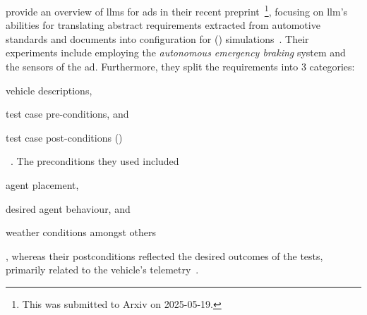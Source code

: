 \citeauthor{requirementsAllYouNeed} provide an overview of \acrshort{llms} for \acrshort{ads} in
their recent preprint~\footnote{This was submitted to Arxiv on
    2025-05-19.}, focusing on \acrshort{llm}'s abilities for translating abstract requirements extracted
from automotive standards and documents into configuration for \carla ()
simulations~\cite{requirementsAllYouNeed}. Their experiments include employing the
\textit{autonomous emergency braking} system and the sensors of the \acrshort{ad}. Furthermore, they
split the requirements into \num{3} categories: \begin{inparaenum}
    \item vehicle descriptions,
    \item test case pre-conditions, and
    \item test case post-conditions ()
\end{inparaenum}~\cite{requirementsAllYouNeed}. The preconditions they used included
\begin{inparaenum}
    \item agent placement,
    \item desired agent behaviour, and
    \item weather conditions amongst others\end{inparaenum}, whereas their postconditions reflected
the desired outcomes of the tests, primarily related to the vehicle's
telemetry~\cite{requirementsAllYouNeed}.
